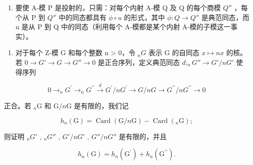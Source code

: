 \begin{enumerate}
\def\labelenumi{(\alph{enumi})}
\setcounter{enumi}{1}
\tightlist
\item
  要使 A-模 P 是投射的，只需：对每个内射 A-模 Q 及 Q 的每个商模 \(Q''\) ，每个从 P 到 \(Q''\) 中的同态都具有 \(\phi \circ u\) 的形式，其中 \(\phi: Q \to Q''\) 是典范同态，而 u 是从 P 到 Q 中的同态（利用每个 A-模都是某个内射 A-模的子模这一事实）。
\end{enumerate}

\begin{enumerate}
\def\labelenumi{\arabic{enumi}.}
\setcounter{enumi}{25}
\tightlist
\item
  对于每个 Z-模 G 和每个整数 n \textgreater{} 0，令 \(_{n}G\) 表示 G 的自同态 \(x \mapsto nx\) 的核。若 \(0 \to G' \to G \to G'' \to 0\) 是正合序列，定义典范同态 \(d:_{n}G'' \to G'/nG'\) 使得序列
\end{enumerate}

\[
0 \longrightarrow_ {n} G ^ {\prime} \longrightarrow_ {n} G ^ {\prime \prime} \stackrel {d} {\longrightarrow} G ^ {\prime} / n G ^ {\prime} \longrightarrow G / n G \longrightarrow G ^ {\prime \prime} / n G ^ {\prime \prime} \longrightarrow 0
\]

正合。若 \(_n\mathrm{G}\) 和 \(\mathrm{G} / n\mathrm{G}\) 是有限的，我们记

\[
h _ {n} (\mathrm{G}) = \operatorname{Card} (\mathrm{G} / n \mathrm{G}) - \operatorname{Card} (_ {n} \mathrm{G});
\]

则证明 \(_{n}G'\) , \(_{n}G''\) , \(G'/nG'\) , \(G''/nG''\) 是有限的，并且

\[
h _ {n} (\mathrm{G}) = h _ {n} \left(\mathrm{G} ^ {\prime}\right) + h _ {n} \left(\mathrm{G} ^ {\prime \prime}\right).
\]

